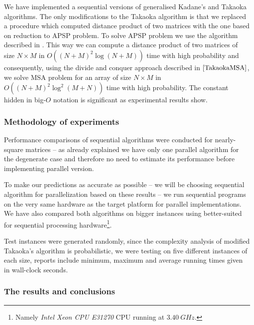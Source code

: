 We have implemented a sequential versions of generalised Kadane's and Takaoka \cite{TakaokaMSA} algorithms.
The only modifications to the Takaoka algorithm is that we replaced a procedure which computed distance product of two matrices with the one based on reduction to APSP problem.
To solve APSP problem we use the algorithm described in \cite{TakaokaHashim}.
This way we can compute a distance product of two matrices of size $N \times M$ in $O((N + M)^2 \log{(N + M)})$ time with high probability and consequently, using the divide and conquer approach described in $\cite{TakaokaMSA}$, we solve MSA problem for an array of size $N \times M$ in $O((N + M)^2 \log^2{(M + N)})$ time with high probability.
The constant hidden in big-$O$ notation is significant as experimental results show.

\subsubsection*{Methodology of experiments}

Performance comparisons of sequential algorithms were conducted for nearly-square matrices -- as already explained we have only one parallel algorithm for the degenerate case and therefore no need to estimate its performance before implementing parallel version.

To make our predictions as accurate as possible -- we will be choosing sequential algorithm for parallelization based on these results -- we run sequential programs on the very same hardware as the target platform for parallel implementations.
We have also compared both algorithms on bigger instances using better-suited for sequential processing hardware\footnote{Namely \emph{Intel Xeon CPU E31270} CPU running at $\SI{3.40}{GHz}$.}.

Test instances were generated randomly, since the complexity analysis of modified Takaoka's algorithm is probabilistic, we were testing on five different instances of each size, reports include minimum, maximum and average running times given in wall-clock seconds.

\subsubsection*{The results and conclusions}

